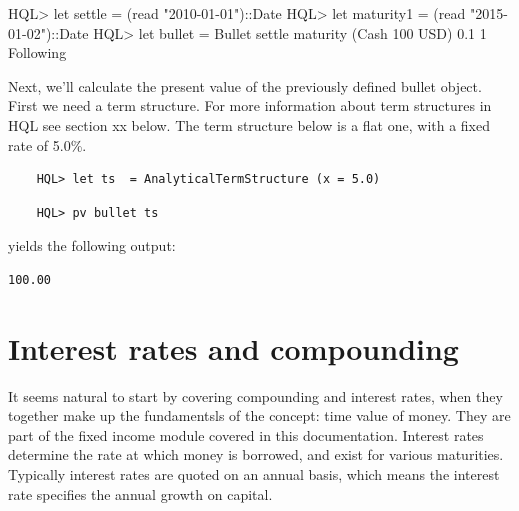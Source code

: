\documentclass[11pt,a4paper]{article}
\numberwithin{equation}{section}
\begin{document}

	\begin{code}[caption=Pricing a Bullet]
  HQL> let settle = (read "2010-01-01")::Date
  HQL> let maturity1 = (read "2015-01-02")::Date
  HQL> let bullet  = Bullet settle maturity (Cash 100 USD) 0.1 1 Following
	\end{code}
		\FrameSep
	Next, we'll calculate the present value of the previously defined bullet object. First we need a term structure. For more information about term structures in HQL see section xx below. The term structure below is a flat one, with a fixed rate of 5.0\%.
		\FrameSep
	\begin{lstlisting}
	HQL> let ts  = AnalyticalTermStructure (x = 5.0)	
	\end{lstlisting}

	\begin{lstlisting}	
	HQL> pv bullet ts
	\end{lstlisting}
	
	yields the following output:
	\FrameSep
	\begin{lstlisting}[style=Output]
	100.00
	\end{lstlisting}
	
	
	


	\section{Interest rates and compounding}
	It seems natural to start by covering compounding and interest rates, when they together make up the fundamentsls of the concept: time value of money. They are part of the fixed income module covered in this documentation.
	Interest rates determine the rate at which money is borrowed, and exist for various maturities. Typically interest rates are quoted on an annual basis, which means the 	interest rate specifies the annual growth on capital.
\end{document}
